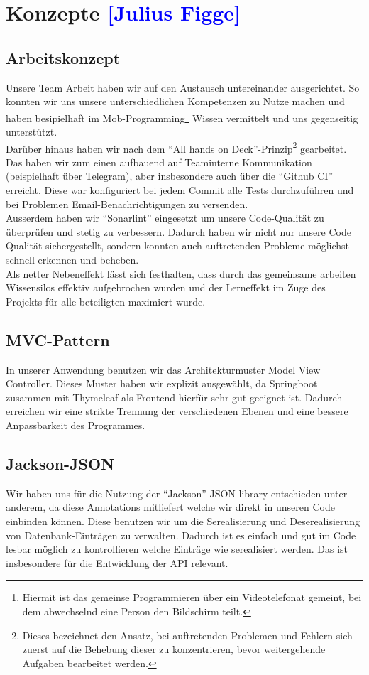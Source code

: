 \section{Konzepte \textcolor{blue}{[Julius Figge]}}

\subsection{Arbeitskonzept}
Unsere Team Arbeit haben wir auf den Austausch untereinander ausgerichtet.
So konnten wir uns unsere unterschiedlichen Kompetenzen zu Nutze machen und haben besipielhaft im Mob-Programming\footnote{Hiermit ist das gemeinse Programmieren über ein Videotelefonat gemeint, bei dem abwechselnd eine Person den Bildschirm teilt.} Wissen vermittelt und uns gegenseitig unterstützt.\\
Darüber hinaus haben wir nach dem \enquote{All hands on Deck}-Prinzip\footnote{Dieses bezeichnet den Ansatz, bei auftretenden Problemen und Fehlern sich zuerst auf die Behebung dieser zu konzentrieren, bevor weitergehende Aufgaben bearbeitet werden.} gearbeitet.\\
Das haben wir zum einen aufbauend auf Teaminterne Kommunikation (beispielhaft über Telegram), aber insbesondere auch über die \enquote{Github CI} erreicht.
Diese war konfiguriert bei jedem Commit alle Tests durchzuführen und bei Problemen Email-Benachrichtigungen zu versenden.\\
Ausserdem haben wir \enquote{Sonarlint} eingesetzt um unsere Code-Qualität zu überprüfen und stetig zu verbessern.
Dadurch haben wir nicht nur unsere Code Qualität sichergestellt, sondern konnten auch auftretenden Probleme möglichst schnell erkennen und beheben.\\
Als netter Nebeneffekt lässt sich festhalten, dass durch das gemeinsame arbeiten Wissensilos effektiv aufgebrochen wurden und der Lerneffekt im Zuge des Projekts für alle beteiligten maximiert wurde.

\subsection{MVC-Pattern}
In unserer Anwendung benutzen wir das Architekturmuster Model View Controller.
Dieses Muster haben wir explizit ausgewählt, da Springboot zusammen mit Thymeleaf als Frontend hierfür sehr gut geeignet ist. Dadurch erreichen wir eine strikte Trennung der verschiedenen Ebenen und eine bessere Anpassbarkeit des Programmes.

\subsection{Jackson-JSON}
Wir haben uns für die Nutzung der \enquote{Jackson}-JSON library entschieden unter anderem, da diese Annotations mitliefert welche wir direkt in unseren Code einbinden können. Diese benutzen wir um die Serealisierung und Deserealisierung von Datenbank-Einträgen zu verwalten. Dadurch ist es einfach und gut im Code lesbar möglich zu kontrollieren welche Einträge wie serealisiert werden. Das ist insbesondere für die Entwicklung der API relevant.